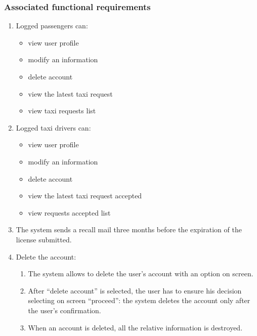 \subsubsection{Associated functional requirements}
\begin{enumerate}

\item Logged passengers can:
\begin{itemize}
\item view user profile
\item modify an information
\item delete account
\item view the latest taxi request
\item view taxi requests list
\end{itemize}

\item Logged taxi drivers can:
\begin{itemize}
\item view user profile
\item modify an information
\item delete account
\item view the latest taxi request accepted
\item view requests accepted list
\end{itemize}

\item The system sends a recall mail three months before the expiration of the license submitted.

\item Delete the account: 
\begin{enumerate}
\item The system allows to delete the user's account with an option on screen.
\item After ``delete account'' is selected, the user has to ensure his decision selecting on screen ``proceed'': the system deletes the account only after the user's confirmation.
\item When an account is deleted, all the relative information is destroyed.
\end{enumerate}


\end{enumerate}
